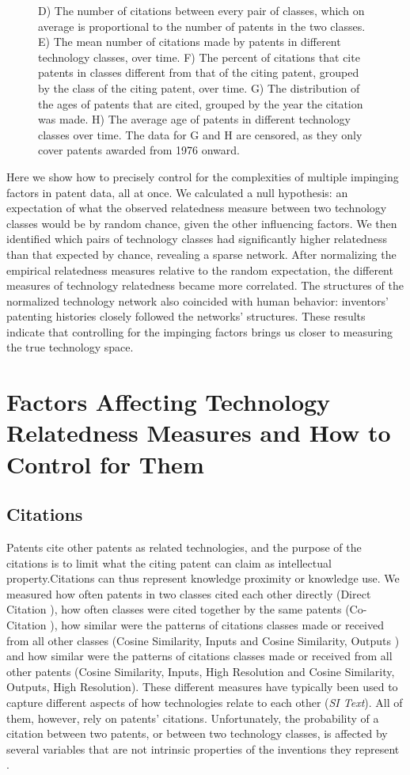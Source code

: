 \documentclass[pre,reprint,groupedaddress,superscriptaddress]{revtex4-1}
\begin{document}
\begin{figure}
{D) The number of citations between every pair of classes, which on average is proportional to the number of patents in the two classes.
E) The mean number of citations made by patents in different technology classes, over time. 
F) The percent of citations that cite patents in classes different from that of the citing patent, grouped by the class of the citing patent, over time.
G) The distribution of the ages of patents that are cited, grouped by the year the citation was made.
H) The average age of patents in different technology classes over time. The data for G and H are censored, as they only cover patents awarded from 1976 onward. 
}\label{Empirical_Normalized_Networks}
\end{figure}

Here we show how to precisely control for the complexities of multiple impinging factors in patent data, all at once. We calculated a null hypothesis: an expectation of what the observed relatedness measure between two technology classes would be by random chance, given the other influencing factors. We then identified which pairs of technology classes had significantly higher relatedness than that expected by chance, revealing a sparse network. After normalizing the empirical relatedness measures relative to the random expectation, the different measures of technology relatedness became more correlated. The structures of the normalized technology network also coincided with human behavior: inventors' patenting histories closely followed the networks' structures. These results indicate that controlling for the impinging factors brings us closer to measuring the true technology space. 

\section{Factors Affecting Technology Relatedness Measures and How to Control for Them}

\subsection{Citations}
Patents cite other patents as related technologies, and the purpose of the citations is to limit what the citing patent can claim as intellectual property.Citations can thus represent knowledge proximity or knowledge use. We measured how often patents in two classes cited each other directly (Direct Citation
), how often classes were cited together by the same patents (Co-Citation
), how similar were the patterns of citations classes made or received from all other classes (Cosine Similarity, Inputs and Cosine Similarity, Outputs
) and how similar were the patterns of citations classes made or received from all other patents (Cosine Similarity, Inputs, High Resolution and Cosine Similarity, Outputs, High Resolution). These different measures have typically been used to capture different aspects of how technologies relate to each other (\textit{SI Text}). All of them, however, rely on patents' citations. Unfortunately, the probability of a citation between two patents, or between two technology classes, is affected by several variables that are not intrinsic properties of the inventions they represent \cite{Hall2001, Uzzi2013}. 
\end{document}

